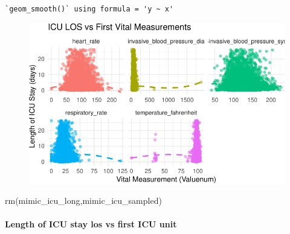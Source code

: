 \documentclass[
]{article}
\let\oldparagraph\paragraph
\renewcommand{\paragraph}[1]{\oldparagraph{#1}\mbox{}}
\newenvironment{Shaded}{\begin{snugshade}}{\end{snugshade}}
\newcommand{\FunctionTok}[1]{\textcolor[rgb]{0.00,0.00,0.00}{#1}}
\newcommand{\NormalTok}[1]{\textcolor[rgb]{0.00,0.00,0.00}{#1}}
\begin{document}
\begin{verbatim}
`geom_smooth()` using formula = 'y ~ x'
\end{verbatim}

\begin{figure}[H]

{\centering \includegraphics{hw3_files/figure-pdf/8.7-1.pdf}

}

\end{figure}

\begin{Shaded}
\begin{Highlighting}[]
\FunctionTok{rm}\NormalTok{(mimic\_icu\_long,mimic\_icu\_sampled)}
\end{Highlighting}
\end{Shaded}

\hypertarget{length-of-icu-stay-los-vs-first-icu-unit}{%
\paragraph{Length of ICU stay los vs first ICU
unit}\label{length-of-icu-stay-los-vs-first-icu-unit}}
\end{document}
